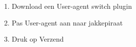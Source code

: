 \begin{enumerate}
  \item Download een User-agent switch plugin
  \item Pas User-agent aan naar jakkepiraat
  \item Druk op Verzend
\end{enumerate}